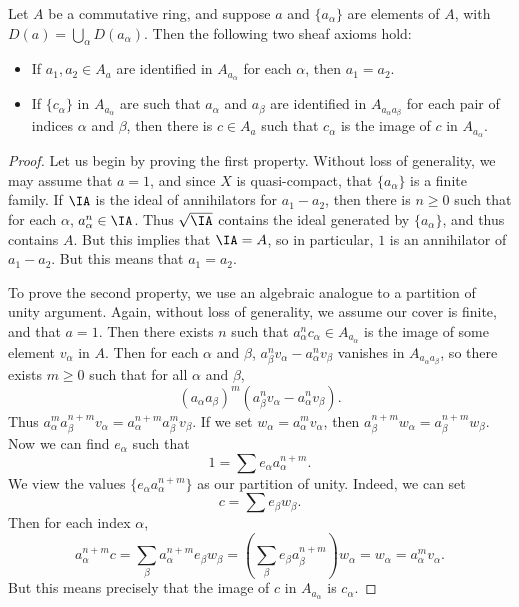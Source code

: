 \begin{lemma}
    Let $A$ be a commutative ring, and suppose $a$ and $\{ a_\alpha \}$ are elements of $A$, with $D(a) = \bigcup_\alpha D(a_\alpha)$. Then the following two sheaf axioms hold:
    \begin{itemize}
        \item If $a_1,a_2 \in A_a$ are identified in $A_{a_\alpha}$ for each $\alpha$, then $a_1 = a_2$.

        \item If $\{ c_\alpha \}$ in $A_{a_\alpha}$ are such that $a_\alpha$ and $a_\beta$ are identified in $A_{a_\alpha a_\beta}$ for each pair of indices $\alpha$ and $\beta$, then there is $c \in A_a$ such that $c_\alpha$ is the image of $c$ in $A_{a_\alpha}$.
    \end{itemize}
\end{lemma}
\begin{proof}
    Let us begin by proving the first property. Without loss of generality, we may assume that $a = 1$, and since $X$ is quasi-compact, that $\{ a_\alpha \}$ is a finite family. If $\IA$ is the ideal of annihilators for $a_1 - a_2$, then there is $n \geq 0$ such that for each $\alpha$, $a_\alpha^n \in \IA$. Thus $\sqrt{\IA}$ contains the ideal generated by $\{ a_\alpha \}$, and thus contains $A$. But this implies that $\IA = A$, so in particular, $1$ is an annihilator of $a_1 - a_2$. But this means that $a_1 = a_2$.

    To prove the second property, we use an algebraic analogue to a partition of unity argument. Again, without loss of generality, we assume our cover is finite, and that $a = 1$. Then there exists $n$ such that $a_\alpha^n c_\alpha \in A_{a_\alpha}$ is the image of some element $v_\alpha$ in $A$. Then for each $\alpha$ and $\beta$, $a_\beta^n v_\alpha - a_\alpha^n v_\beta$ vanishes in $A_{a_\alpha a_\beta}$, so there exists $m \geq 0$ such that for all $\alpha$ and $\beta$,
    \[ (a_\alpha a_\beta)^m (a_\beta^n v_\alpha - a_\alpha^n v_\beta). \]
    Thus $a_\alpha^m a_\beta^{n+m} v_\alpha = a_\alpha^{n + m} a_\beta^m v_\beta$. If we set $w_\alpha = a_\alpha^m v_\alpha$, then $a_\beta^{n+m} w_\alpha = a_\beta^{n+m} w_\beta$. Now we can find $e_\alpha$ such that
    \[ 1 = \sum e_\alpha a_\alpha^{n + m}. \]
    We view the values $\{ e_\alpha a_\alpha^{n+m} \}$ as our partition of unity. Indeed, we can set
    \[ c = \sum e_\beta w_\beta. \]
    Then for each index $\alpha$,
    \[ a_\alpha^{n + m} c = \sum_\beta a_\alpha^{n+m} e_\beta w_\beta = \left( \sum_\beta e_\beta a_\beta^{n+m} \right) w_\alpha = w_\alpha = a_\alpha^m v_\alpha. \]
    But this means precisely that the image of $c$ in $A_{a_\alpha}$ is $c_\alpha$.
\end{proof}

